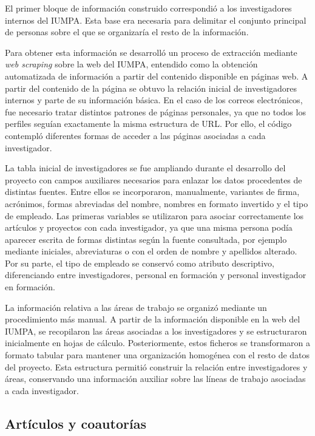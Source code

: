 \documentclass[11pt,spanish,listoffigures,listoftables]{tfgetsinf}
\begin{document}
El primer bloque de información construido correspondió a los investigadores internos del IUMPA. Esta base era necesaria para delimitar el conjunto principal de personas sobre el que se organizaría el resto de la información.

Para obtener esta información se desarrolló un proceso de extracción mediante \textit{web scraping} sobre la web del IUMPA, entendido como la obtención automatizada de información a partir del contenido disponible en páginas web. A partir del contenido de la página se obtuvo la relación inicial de investigadores internos y parte de su información básica. En el caso de los correos electrónicos, fue necesario tratar distintos patrones de páginas personales, ya que no todos los perfiles seguían exactamente la misma estructura de URL. Por ello, el código contempló diferentes formas de acceder a las páginas asociadas a cada investigador.

La tabla inicial de investigadores se fue ampliando durante el desarrollo del proyecto con campos auxiliares necesarios para enlazar los datos procedentes de distintas fuentes. Entre ellos se incorporaron, manualmente, variantes de firma, acrónimos, formas abreviadas del nombre, nombres en formato invertido y el tipo de empleado. Las primeras variables se utilizaron para asociar correctamente los artículos y proyectos con cada investigador, ya que una misma persona podía aparecer escrita de formas distintas según la fuente consultada, por ejemplo mediante iniciales, abreviaturas o con el orden de nombre y apellidos alterado. Por su parte, el tipo de empleado se conservó como atributo descriptivo, diferenciando entre investigadores, personal en formación y personal investigador en formación.

La información relativa a las áreas de trabajo se organizó mediante un procedimiento más manual. A partir de la información disponible en la web del IUMPA, se recopilaron las áreas asociadas a los investigadores y se estructuraron inicialmente en hojas de cálculo. Posteriormente, estos ficheros se transformaron a formato tabular para mantener una organización homogénea con el resto de datos del proyecto. Esta estructura permitió construir la relación entre investigadores y áreas, conservando una información auxiliar sobre las líneas de trabajo asociadas a cada investigador.

\subsection{Artículos y coautorías}
\end{document}
